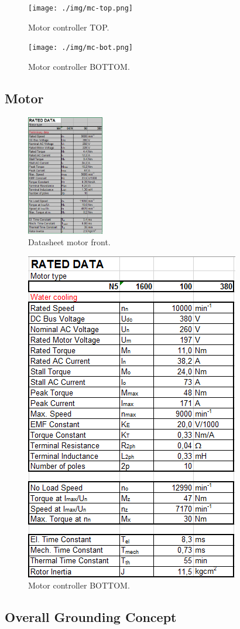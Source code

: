 \begin{figure}[H]
	\centering
	\texttt{[image: ./img/mc-top.png]}
	\caption{Motor controller TOP.}
	\label{app:mc-top}
\end{figure}

\begin{figure}[H]
	\centering
	\texttt{[image: ./img/mc-bot.png]}
	\caption{Motor controller BOTTOM.}
	\label{app:mc-bot}
\end{figure}

\subsection{Motor}

\begin{figure}[H]
	\centering
	\includegraphics[width=0.3\textwidth]{./img/app-mf.png}
	\caption{Datasheet motor front.}
	\label{app:mf}
\end{figure}

\begin{figure}[H]
	\centering
	\includegraphics[width=.3\textwidth]{./img/app-mr.png}
	\caption{Motor controller BOTTOM.}
	\label{app:mr}
\end{figure}

\subsection{Overall Grounding Concept}

